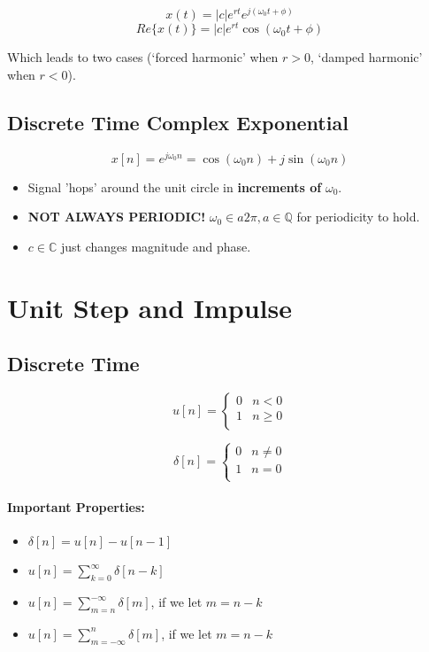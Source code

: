 \documentclass[a4paper,12pt]{report}
\begin{document}
$$x(t) = |c|e^{rt} e^{j(\omega_0 t + \phi)}$$
$$Re\{x(t)\} = |c|e^{rt} \cos(\omega_0 t + \phi)$$

Which leads to two cases (`forced harmonic' when $r>0$, `damped harmonic' when $r < 0$).

\subsection{Discrete Time Complex Exponential} 

$$x[n] = e^{j\omega_0 n} = \cos(\omega_0 n) + j\sin(\omega_0 n)$$

\begin{itemize}
\item Signal 'hops' around the unit circle in \textbf{increments of} $\omega_0$.
\item \textbf{NOT ALWAYS PERIODIC!} $\omega_0 \in a2\pi, a\in \mathbb{Q}$ for periodicity to hold.
\item $c\in\mathbb{C}$ just changes magnitude and phase.
\end{itemize}

\section{Unit Step and Impulse}

\subsection{Discrete Time}

\begin{equation}
	u[n] = 
	\begin{cases}
		0 & n < 0 \\
		1 & n \geq 0 \\
	\end{cases}
\end{equation}

\begin{equation}
	\delta[n] = 
	\begin{cases}
		0 & n \neq 0 \\
		1 & n = 0 \\
	\end{cases}
\end{equation}


\paragraph{Important Properties: } 
\begin{itemize}
\item $\delta[n] = u[n] - u[n-1]$
\item $u[n] = \sum_{k=0}^\infty \delta[n-k]$
\item $u[n] = \sum_{m=n}^{-\infty} \delta[m]$, if we let $m = n-k$
\item $u[n] = \sum_{m=-\infty}^n \delta[m]$, if we let $m = n-k$
\end{itemize}
\end{document}

